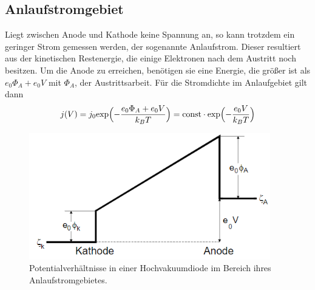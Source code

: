 \subsection{Anlaufstromgebiet}
Liegt zwischen Anode und Kathode keine Spannung an, so kann trotzdem ein geringer
Strom gemessen werden, der sogenannte Anlaufstrom. Dieser resultiert aus der kinetischen
Restenergie, die einige Elektronen nach dem Austritt noch besitzen. Um die Anode
zu erreichen, benötigen sie eine Energie, die größer ist als $e_0\Phi_A+e_0V$ mit $\Phi_A$, der
Austrittsarbeit. Für die Stromdichte im Anlaufgebiet gilt dann
\begin{equation}
    j(V)= j_0 \text{exp}\Bigl( - \frac{e_0\Phi_A+e_0V}{k_BT}\Bigr)= \text{const} \cdot \text{exp}\Bigl(-\frac{e_0V}{k_BT}\Bigr) \\
\end{equation}
\begin{figure}[H]
    \begin{center}
    \includegraphics[width = 10.5cm, height= 5.5cm]{Anlaufstromgebiet.png}
    \caption{Potentialverhältnisse in einer Hochvakuumdiode im Bereich ihres Anlaufstromgebietes.\protect\cite{AL}}
    \end{center}
    \label{fig:Anlaufgebiet}
    \end{figure}
    \noindent
